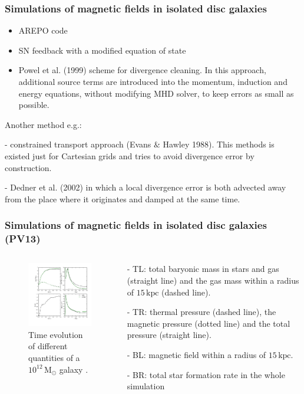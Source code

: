 \documentclass[10pt,aspectratio=169]{beamer}
\begin{document}
\begin{frame}
	\frametitle{Simulations of magnetic fields in isolated disc galaxies \citep{2013MNRAS.432..176P}}
	\begin{itemize}
		\item AREPO code 
		\item SN feedback with a modified equation of state
		\item Powel et al. (1999) scheme for divergence cleaning. In this approach, additional source terms are introduced into the momentum, induction and energy equations, without modifying MHD solver, to keep errors as small as possible.
	\end{itemize}
Another method e.g.: 

- constrained transport approach (Evans $\&$ Hawley 1988). This methods is existed just for Cartesian grids and tries to avoid divergence error by construction.

- Dedner et al. (2002) in which a local divergence error is both advected away from the place where it originates and damped at the same time.
\end{frame}
\begin{frame}
	\frametitle{Simulations of magnetic fields in isolated disc galaxies (PV13)}
	\begin{columns}
		\begin{column}{0.55\textwidth}
			\begin{figure}
				\includegraphics[width=7cm,trim=40 50 5 30,clip]{./images/timedepCmp.pdf}
				\caption{Time evolution of different quantities of a
					$10^{12}\,\mathrm{M_\odot}$ galaxy .}
			\end{figure}
		\end{column}
		\begin{column}{0.48\textwidth}
			
			- TL: total	baryonic mass in stars and gas (straight line) and the gas mass within a radius of $15\,\mathrm{kpc}$ (dashed line). 
			
			- TR: thermal pressure (dashed line), the magnetic pressure (dotted line) and the total pressure (straight line).
			
			- BL: magnetic field within a radius of $15\,\mathrm{kpc}$. 
			
			- BR: total star formation rate in the whole simulation
		\end{column}
	\end{columns}
\end{frame}
\end{document}
